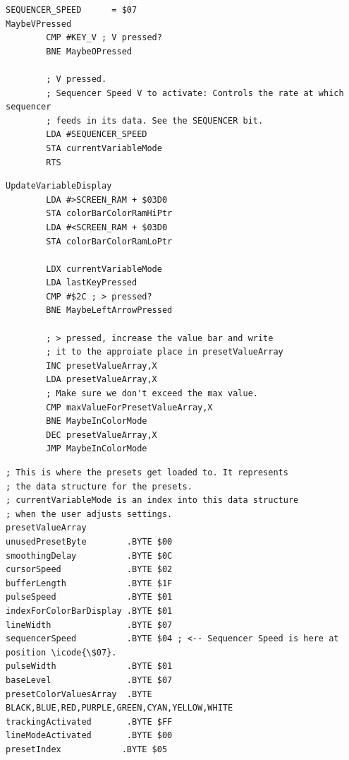 \begin{lstlisting}[caption=From \icode{CheckKeyboardInput}.]
SEQUENCER_SPEED      = $07
MaybeVPressed   
        CMP #KEY_V ; V pressed?
        BNE MaybeOPressed

        ; V pressed.
        ; Sequencer Speed V to activate: Controls the rate at which sequencer
        ; feeds in its data. See the SEQUENCER bit.
        LDA #SEQUENCER_SPEED
        STA currentVariableMode
        RTS 
\end{lstlisting}

\begin{lstlisting}[caption=From \icode{CheckKeyboardInputForActiveVariable}. Pressing the < and > keys increments and
decrements the value in presetValueArray pointed to by \icode{X}\, i.e. \icode{currentVariableMode}.]
UpdateVariableDisplay   
        LDA #>SCREEN_RAM + $03D0
        STA colorBarColorRamHiPtr
        LDA #<SCREEN_RAM + $03D0
        STA colorBarColorRamLoPtr

        LDX currentVariableMode
        LDA lastKeyPressed
        CMP #$2C ; > pressed?
        BNE MaybeLeftArrowPressed

        ; > pressed, increase the value bar and write
        ; it to the approiate place in presetValueArray
        INC presetValueArray,X
        LDA presetValueArray,X
        ; Make sure we don't exceed the max value.
        CMP maxValueForPresetValueArray,X
        BNE MaybeInColorMode
        DEC presetValueArray,X
        JMP MaybeInColorMode
\end{lstlisting}

\begin{lstlisting}[caption=From \icode{ActivateSequencer}.]
; This is where the presets get loaded to. It represents
; the data structure for the presets.
; currentVariableMode is an index into this data structure
; when the user adjusts settings.
presetValueArray
unusedPresetByte        .BYTE $00
smoothingDelay          .BYTE $0C
cursorSpeed             .BYTE $02
bufferLength            .BYTE $1F
pulseSpeed              .BYTE $01
indexForColorBarDisplay .BYTE $01
lineWidth               .BYTE $07
sequencerSpeed          .BYTE $04 ; <-- Sequencer Speed is here at position \icode{\$07}.
pulseWidth              .BYTE $01
baseLevel               .BYTE $07
presetColorValuesArray  .BYTE BLACK,BLUE,RED,PURPLE,GREEN,CYAN,YELLOW,WHITE
trackingActivated       .BYTE $FF
lineModeActivated       .BYTE $00
presetIndex            .BYTE $05
\end{lstlisting}


